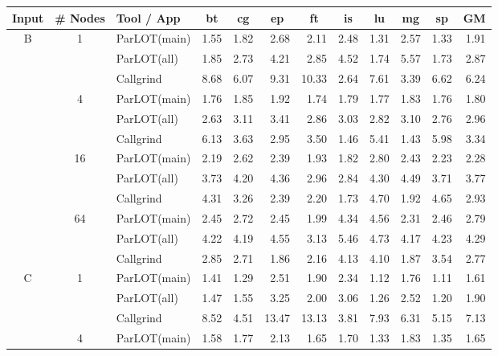 \begin{table*}[]
\label{comet_sd_pMpAcg_BC_int_p3.5}
\begin{center}
\begin{tabular}{|c|c|l|rrrrrrrr|r|}
\hline
\multicolumn{1}{|l|}{Input} & \multicolumn{1}{l|}{\# Nodes} & Tool / App & \multicolumn{1}{c}{bt} & \multicolumn{1}{c}{cg} & \multicolumn{1}{c}{ep} & \multicolumn{1}{c}{ft} & \multicolumn{1}{c}{is} & \multicolumn{1}{c}{lu} & \multicolumn{1}{c}{mg} & \multicolumn{1}{c|}{sp} & \multicolumn{1}{c|}{GM} \\ \hline
\multirow{12}{*}{B} & \multirow{3}{*}{1} & ParLOT(main) & 1.55 & 1.82 & 2.68 & 2.11 & 2.48 & 1.31 & 2.57 & 1.33 & 1.91 \\
 &  & ParLOT(all) & 1.85 & 2.73 & 4.21 & 2.85 & 4.52 & 1.74 & 5.57 & 1.73 & 2.87 \\
 &  & Callgrind & 8.68 & 6.07 & 9.31 & 10.33 & 2.64 & 7.61 & 3.39 & 6.62 & 6.24 \\ \cline{2-12} 
 & \multirow{3}{*}{4} & ParLOT(main) & 1.76 & 1.85 & 1.92 & 1.74 & 1.79 & 1.77 & 1.83 & 1.76 & 1.80 \\
 &  & ParLOT(all) & 2.63 & 3.11 & 3.41 & 2.86 & 3.03 & 2.82 & 3.10 & 2.76 & 2.96 \\
 &  & Callgrind & 6.13 & 3.63 & 2.95 & 3.50 & 1.46 & 5.41 & 1.43 & 5.98 & 3.34 \\ \cline{2-12} 
 & \multirow{3}{*}{16} & ParLOT(main) & 2.19 & 2.62 & 2.39 & 1.93 & 1.82 & 2.80 & 2.43 & 2.23 & 2.28 \\
 &  & ParLOT(all) & 3.73 & 4.20 & 4.36 & 2.96 & 2.84 & 4.30 & 4.49 & 3.71 & 3.77 \\
 &  & Callgrind & 4.31 & 3.26 & 2.39 & 2.20 & 1.73 & 4.70 & 1.92 & 4.65 & 2.93 \\ \cline{2-12} 
 & \multirow{3}{*}{64} & ParLOT(main) & 2.45 & 2.72 & 2.45 & 1.99 & 4.34 & 4.56 & 2.31 & 2.46 & 2.79 \\
 &  & ParLOT(all) & 4.22 & 4.19 & 4.55 & 3.13 & 5.46 & 4.73 & 4.17 & 4.23 & 4.29 \\
 &  & Callgrind & 2.85 & 2.71 & 1.86 & 2.16 & 4.13 & 4.10 & 1.87 & 3.54 & 2.77 \\ \hline
\multirow{12}{*}{C} & \multirow{3}{*}{1} & ParLOT(main) & 1.41 & 1.29 & 2.51 & 1.90 & 2.34 & 1.12 & 1.76 & 1.11 & 1.61 \\
 &  & ParLOT(all) & 1.47 & 1.55 & 3.25 & 2.00 & 3.06 & 1.26 & 2.52 & 1.20 & 1.90 \\
 &  & Callgrind & 8.52 & 4.51 & 13.47 & 13.13 & 3.81 & 7.93 & 6.31 & 5.15 & 7.13 \\ \cline{2-12} 
 & \multirow{3}{*}{4} & ParLOT(main) & 1.58 & 1.77 & 2.13 & 1.65 & 1.70 & 1.33 & 1.83 & 1.35 & 1.65 \\

\end{tabular}
\end{center}
\end{table*}

